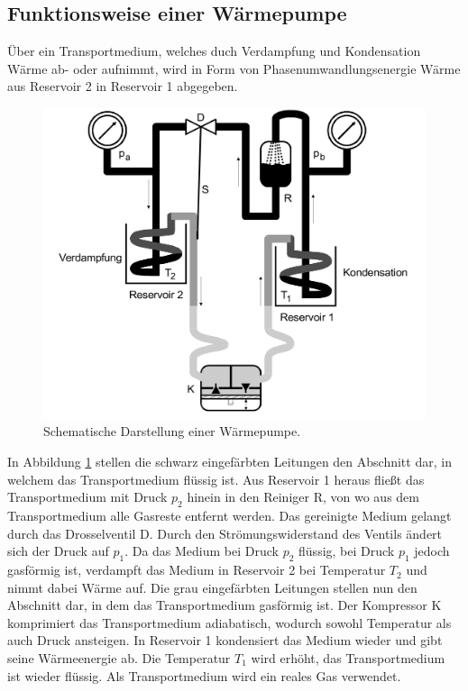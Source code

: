 \documentclass{scrartcl} %
\begin{document}
    \subsection{Funktionsweise einer Wärmepumpe}
      Über ein Transportmedium, welches duch Verdampfung und Kondensation Wärme ab- oder aufnimmt,
      wird in Form von Phasenumwandlungsenergie Wärme aus Reservoir 2 in Reservoir 1 abgegeben.
      \begin{figure}
        \centering
        \includegraphics[scale = 0.15]{AufbauWaermepumpe.png}
        \caption{Schematische Darstellung einer Wärmepumpe.}
        \label{fig:wärmepumpe1}
      \end{figure}
      In Abbildung \ref{fig:wärmepumpe1} stellen die schwarz eingefärbten Leitungen den Abschnitt dar, in welchem das Transportmedium flüssig ist.
      Aus Reservoir 1 heraus fließt das Transportmedium mit Druck $p_\text{2}$ hinein in den Reiniger R, von wo aus dem Transportmedium alle Gasreste entfernt werden.
      Das gereinigte Medium gelangt durch das Drosselventil D. Durch den Strömungswiderstand des Ventils ändert sich der Druck auf $p_\text{1}$. Da das Medium bei Druck $p_\text{2}$
      flüssig, bei Druck $p_\text{1}$ jedoch gasförmig ist, verdampft das Medium in Reservoir 2 bei Temperatur $T_\text{2}$ und nimmt dabei Wärme auf. Die grau eingefärbten Leitungen
      stellen nun den Abschnitt dar, in dem das Transportmedium gasförmig ist. Der Kompressor K komprimiert das Transportmedium adiabatisch,
      wodurch sowohl Temperatur als auch Druck ansteigen.
      In Reservoir 1 kondensiert das Medium wieder und gibt seine Wärmeenergie ab. Die Temperatur $T_\text{1}$ wird erhöht, das
      Transportmedium ist wieder flüssig. Als Transportmedium wird ein reales Gas verwendet.
\end{document}
